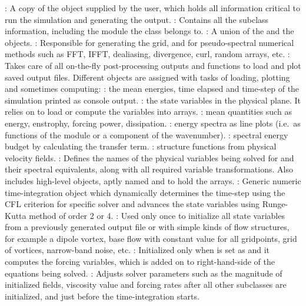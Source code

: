 \begin{outline}
\1 : A copy of the  object supplied
by the user, which holds all information critical to run the simulation and
generating the output.
%
\1 : Contains all the subclass information,
including the module the class belongs to.
%
\1 : A union of the  and the
 objects.
%
\1 : Responsible for generating the grid, and for
pseudo-spectral numerical methods such as FFT, IFFT, dealiasing, divergence,
curl, random arrays, etc.
%
\1 : Takes care of all on-the-fly post-processing
outputs and functions to load and plot saved output files. Different objects
are assigned with tasks of loading, plotting and sometimes computing:
%
\2 : the mean energies, time elapsed and
time-step of the simulation printed as console output.
%
\2 : the state variables in the physical
plane.  It relies on  to load or compute the variables
into arrays.
%
\2 : mean quantities such as energy,
enstrophy, forcing power, dissipation.
%
\2 : energy spectra as line plots (i.e.\ as
functions of the module or a component of the wavenumber).
%
\2 : spectral energy budget by
calculating the transfer term.
%
\2 : structure functions from physical
velocity fields.
%
\1 : Defines the names of the physical variables being
solved for and their spectral equivalents, along with all required variable
transformations.
%
Also includes high-level objects, aptly named 
and  to hold the arrays.
%
\1 : Generic numeric time-integration object
which dynamically determines the time-step using the CFL criterion for specific
solver and advances the state variables using Runge-Kutta method of order 2 or
4.
%
\1 : Used only once to initialize all state variables
from a previously generated output file or with simple kinds of flow structures,
for example a dipole vortex, base flow with constant value for all gridpoints,
grid of vortices, narrow-band noise, etc.
%
\1 : Initialized only when
 is set as  and it computes
the forcing variables, which is added on to right-hand-side of the equations
being solved.
%
\1 : Adjusts solver parameters such as the magnitude
of initialized fields, viscosity value and forcing rates after all other
subclasses are initialized, and just before the time-integration starts.
\end{outline}

